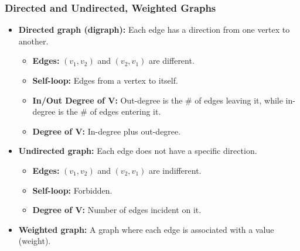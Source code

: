    \subsubsection{Directed and Undirected, Weighted Graphs}
        \begin{definition}
            \begin{itemize}
                \item \textbf{Directed graph (digraph):} Each edge has a direction from one vertex to another. 
                \begin{itemize}
                    \item \textbf{Edges:} $(v_1,v_2)$ and $(v_2,v_1)$ are different.
                    \item \textbf{Self-loop:} Edges from a vertex to itself.
                    \item \textbf{In/Out Degree of V:} Out-degree is the \# of edges leaving it, while in-degree is the \# of edges entering it.
                    \item \textbf{Degree of V:} In-degree plus out-degree.
                \end{itemize}
                \item \textbf{Undirected graph:} Each edge does not have a specific direction.
                \begin{itemize}
                    \item \textbf{Edges:} $(v_1,v_2)$ and $(v_2,v_1)$ are indifferent.
                    \item \textbf{Self-loop:} Forbidden.
                    \item \textbf{Degree of V:} Number of edges incident on it.
                \end{itemize}
                \item \textbf{Weighted graph:} A graph where each edge is associated with a value (weight).
            \end{itemize}
        \end{definition}


